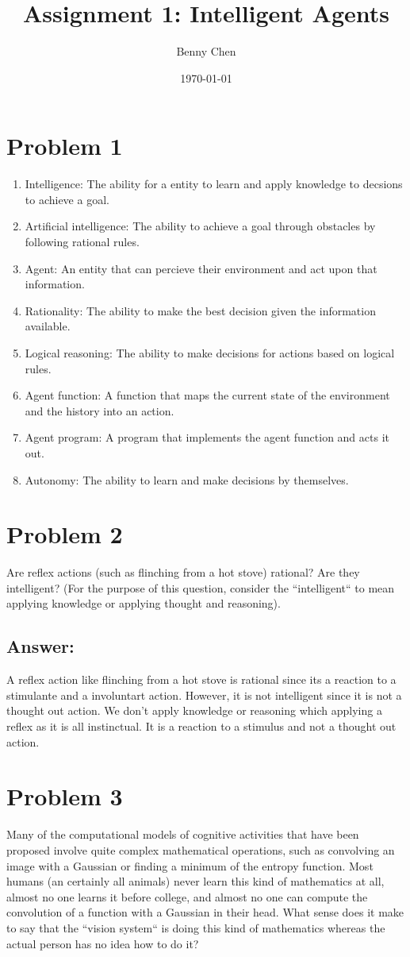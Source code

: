 \documentclass{article}
\title{Assignment 1: Intelligent Agents}
\author{Benny Chen}
\date{\today}
\begin{document}
\maketitle

\section*{Problem 1}
\begin{enumerate}[label= (\alph*)]
    \item Intelligence: The ability for a entity to learn and apply knowledge to decsions to achieve a goal.
    \item Artificial intelligence: The ability to achieve a goal through obstacles by following rational rules.
    \item Agent: An entity that can percieve their environment and act upon that information.
    \item Rationality: The ability to make the best decision given the information available.
    \item Logical reasoning: The ability to make decisions for actions based on logical rules.
    \item Agent function: A function that maps the current state of the environment and the history into an action.
    \item Agent program: A program that implements the agent function and acts it out.
    \item Autonomy: The ability to learn and make decisions by themselves.
\end{enumerate}
\section*{Problem 2}
Are reflex actions (such as flinching from a hot stove) rational? Are they intelligent? (For the purpose of this question, consider the “intelligent“ to mean applying knowledge or applying thought and reasoning).
\subsection*{Answer:}
A reflex action like flinching from a hot stove is rational since its a reaction to a stimulante and a involuntart action. However, it is not intelligent since it is not a thought out action. We don't apply knowledge or reasoning which applying a reflex as it is all instinctual. It is a reaction to a stimulus and not a thought out action.

\section*{Problem 3}
Many of the computational models of cognitive activities that have been proposed involve quite complex mathematical operations, such as convolving an image with a Gaussian or finding a minimum of the entropy function. Most humans (an certainly all animals) never learn this kind of mathematics at all, almost no one learns it before college, and almost no one can compute the convolution of a function with a Gaussian in their head. What sense does it make to say that the “vision system“ is doing this kind of mathematics whereas the actual person has no idea how to do it?
\end{document}
